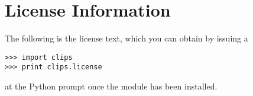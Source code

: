\chapter{License Information\label{pyclips-license}}

The following is the license text, which you can obtain by issuing a

\begin{verbatim}
>>> import clips
>>> print clips.license
\end{verbatim}

at the Python prompt once the \pyclips{} module has been installed.



